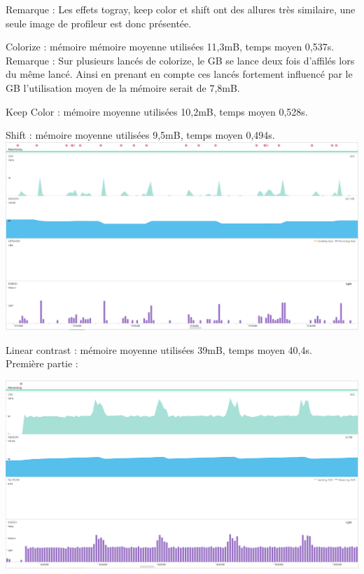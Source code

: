\documentclass[12pt]{article}
\begin{document}
\begin{itemize}
    Remarque :
    Les effets togray, keep color et shift ont des allures très similaire, une seule image de profileur est donc présentée.\\

 \bigskip




    Colorize : mémoire  mémoire moyenne utilisées 11,3mB, temps moyen 0,537s.\\

    Remarque :
    Sur plusieurs lancés de colorize, le GB se lance deux fois d’affilés lors du même lancé. Ainsi en prenant en compte ces lancés fortement influencé par le GB l’utilisation moyen de la mémoire serait  de 7,8mB.\\

 \bigskip



    Keep Color : mémoire moyenne utilisées 10,2mB, temps moyen 0,528s.\\

 \bigskip




    Shift : mémoire moyenne utilisées 9,5mB, temps moyen 0,494s.\\




\includegraphics[width=\textwidth]{1-shift}

 \bigskip



Linear contrast : mémoire moyenne utilisées 39mB, temps moyen 40,4s.\\

 \bigskip
Première partie :\\
 \bigskip

    \includegraphics[width=\textwidth]{linelong1}
 \bigskip
 \bigskip
 \bigskip
 \bigskip


\end{itemize}
\end{document}
